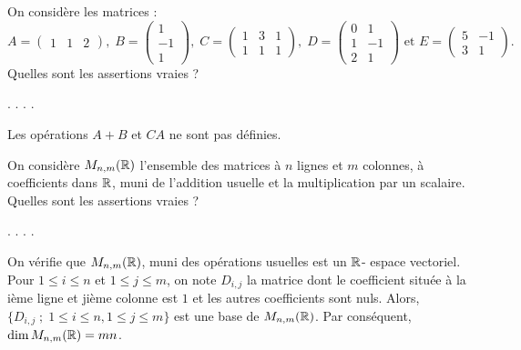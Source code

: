 \begin{question}
On considère les matrices : 
$$A=\left(\begin{array}{rcc}
1&1&2\end{array}\right),\; B=  
\left(\begin{array}{rc}1\\-1\\ 1
\end{array}\right),\; C=  
\left(\begin{array}{rcc}
1&3&1\\ 1&1&1
\end{array}\right),\; D= \left(\begin{array}{rc}
0&1\\ 1&-1\\ 2&1 \end{array}\right)\mbox{ et }E=\left(\begin{array}{rc}5&-1\\3&1\end{array}\right).$$
Quelles sont les assertions vraies ?
\begin{answers}  
.
.
.
.
\end{answers}
\begin{explanations} Les opérations $A+B$ et $CA$ ne sont pas définies.
\end{explanations}
\end{question}
    
\begin{question}
On considère $M_{n,m} (\mathbb{R})$ l'ensemble des matrices à $n$ lignes et $m$ colonnes, à  coefficients dans $\mathbb{R}$, muni de l'addition usuelle et la multiplication par un scalaire. Quelles sont les assertions vraies ?
\begin{answers}  
.
.
.
.
\end{answers}
\begin{explanations} On vérifie que $M_{n,m} (\mathbb{R})$, muni des opérations usuelles est un $\mathbb{R}$- espace vectoriel.
\vskip0mm
Pour $1\le i\le n$ et $1\le j\le m$, on note $D_{i,j}$ la matrice dont le coefficient située à la ième ligne et jième colonne est $1$ et les autres coefficients sont nuls. Alors, $\{D_{i,j}\; ; \; 1\le i\le n, 1\le j\le m\}$ est une base de $M_{n,m} (\mathbb{R})$. Par conséquent, $\dim M_{n,m} (\mathbb{R}) = mn $.
\end{explanations}
\end{question}
 
